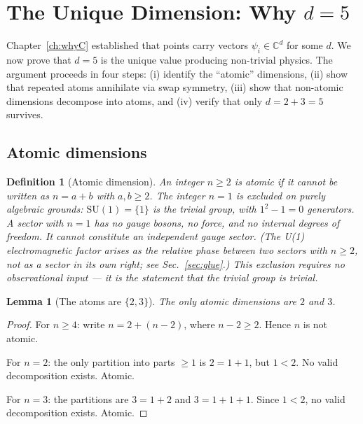 \documentclass[12pt]{article}
\newtheorem{lemma}[theorem]{Lemma}
\newtheorem{definition}[theorem]{Definition}
\theoremstyle{remark}
\theoremstyle{definition}
\begin{document}

\section{The Unique Dimension: Why $d = 5$}
\label{ch:whyd5}

Chapter~\ref{ch:whyC} established that points carry vectors $\psi_i \in \mathbb{C}^d$ for some $d$. We now prove that $d = 5$ is the unique value producing non-trivial physics. The argument proceeds in four steps: (i) identify the ``atomic'' dimensions, (ii) show that repeated atoms annihilate via swap symmetry, (iii) show that non-atomic dimensions decompose into atoms, and (iv) verify that only $d = 2 + 3 = 5$ survives.

\subsection{Atomic dimensions}

\begin{definition}[Atomic dimension]
An integer $n \geq 2$ is \emph{atomic} if it cannot be written as $n = a + b$ with $a, b \geq 2$. The integer $n = 1$ is excluded on purely algebraic grounds: $\text{SU}(1) = \{1\}$ is the trivial group, with $1^2 - 1 = 0$ generators. A sector with $n = 1$ has no gauge bosons, no force, and no internal degrees of freedom. It cannot constitute an independent gauge sector. (The U(1) electromagnetic factor arises as the \emph{relative phase between two sectors with $n \geq 2$}, not as a sector in its own right; see Sec.~\ref{sec:glue}.) This exclusion requires no observational input --- it is the statement that the trivial group is trivial.
\end{definition}

\begin{lemma}[The atoms are $\{2, 3\}$]
\label{lem:atoms}
The only atomic dimensions are $2$ and $3$.
\end{lemma}

\begin{proof}
For $n \geq 4$: write $n = 2 + (n - 2)$, where $n - 2 \geq 2$. Hence $n$ is not atomic.

For $n = 2$: the only partition into parts $\geq 1$ is $2 = 1 + 1$, but $1 < 2$. No valid decomposition exists. Atomic.

For $n = 3$: the partitions are $3 = 1 + 2$ and $3 = 1 + 1 + 1$. Since $1 < 2$, no valid decomposition exists. Atomic.
\end{proof}
\end{document}
